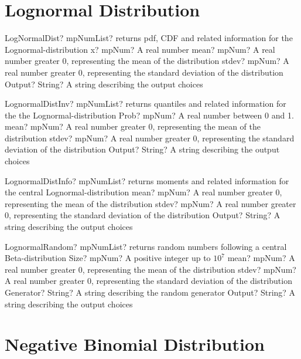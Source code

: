 \documentclass[12pt,a4paper,openany]{book}
\begin{document}
\section{Lognormal Distribution}

\begin{mpFunctionsExtract}
\mpFunctionFour
{LogNormalDist? mpNumList? returns pdf, CDF and related information for the Lognormal-distribution}
{x? mpNum? A real number}
{mean? mpNum? A real number greater 0, representing the mean of the distribution}
{stdev? mpNum? A real number greater 0, representing the standard deviation of the distribution}
{Output? String? A string describing the output choices}
\end{mpFunctionsExtract}

\begin{mpFunctionsExtract}
\mpFunctionFour
{LognormalDistInv? mpNumList? returns quantiles and related information for the the Lognormal-distribution}
{Prob? mpNum? A real number between 0 and 1.}
{mean? mpNum? A real number greater 0, representing the mean of the distribution}
{stdev? mpNum? A real number greater 0, representing the standard deviation of the distribution}
{Output? String? A string describing the output choices}
\end{mpFunctionsExtract}

\begin{mpFunctionsExtract}
\mpFunctionThree
{LognormalDistInfo? mpNumList? returns moments and related information for the central Lognormal-distribution}
{mean? mpNum? A real number greater 0, representing the mean of the distribution}
{stdev? mpNum? A real number greater 0, representing the standard deviation of the distribution}
{Output? String? A string describing the output choices}
\end{mpFunctionsExtract}

\begin{mpFunctionsExtract}
\mpFunctionFive
{LognormalRandom? mpNumList? returns random numbers following a central Beta-distribution}
{Size? mpNum? A positive integer up to $10^7$}
{mean? mpNum? A real number greater 0, representing the mean of the distribution}
{stdev? mpNum? A real number greater 0, representing the standard deviation of the distribution}
{Generator? String? A string describing the random generator}
{Output? String? A string describing the output choices}
\end{mpFunctionsExtract}

\section{Negative Binomial Distribution}
\end{document}
